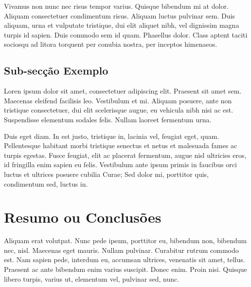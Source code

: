 Vivamus non nunc nec risus tempor varius. Quisque bibendum mi at
dolor. Aliquam consectetuer condimentum risus. Aliquam luctus pulvinar
sem. Duis aliquam, urna et vulputate tristique, dui elit aliquet nibh,
vel dignissim magna turpis id sapien. Duis commodo sem id
quam. Phasellus dolor. Class aptent taciti sociosqu ad litora torquent
per conubia nostra, per inceptos himenaeos. 

\subsection{Sub-secção Exemplo}

Loren ipsum dolor sit amet, consectetuer adipiscing elit. 
Praesent sit amet sem. Maecenas eleifend facilisis leo. Vestibulum et
mi. Aliquam posuere, ante non tristique consectetuer, dui elit
scelerisque augue, eu vehicula nibh nisi ac est. Suspendisse elementum
sodales felis. Nullam laoreet fermentum urna. 

Duis eget diam. In est justo, tristique in, lacinia vel, feugiat eget,
quam. Pellentesque habitant morbi tristique senectus et netus et
malesuada fames ac turpis egestas. Fusce feugiat, elit ac placerat
fermentum, augue nisl ultricies eros, id fringilla enim sapien eu
felis. Vestibulum ante ipsum primis in faucibus orci luctus et
ultrices posuere cubilia Curae; Sed dolor mi, porttitor quis,
condimentum sed, luctus in. 

\section{Resumo ou Conclusões}

Aliquam erat volutpat. Nunc pede ipsum, porttitor eu, bibendum non,
bibendum nec, nisl. Maecenas eget mauris. Nullam pulvinar. Curabitur
rutrum commodo est. Nam sapien pede, interdum eu, accumsan ultrices,
venenatis sit amet, tellus. Praesent ac ante bibendum enim varius
suscipit. Donec enim. Proin nisi. Quisque libero turpis, varius ut,
elementum vel, pulvinar sed, nunc. 
